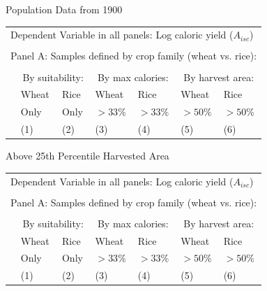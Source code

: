\documentclass[10pt, xcolor=dvipsnames]{beamer}
\begin{document}
\begin{frame}{Population Data from 1900}\label{reg1900}

{\footnotesize
\begin{tabularx}{\textwidth}{lXXXXXX}
\midrule
\multicolumn{7}{l}{Dependent Variable in all panels: Log caloric yield ($A_{isc}$)} \\ \\
\multicolumn{7}{l}{Panel A: Samples defined by crop family (wheat vs. rice):} \\ \\
 & \multicolumn{2}{c}{By suitability:} & \multicolumn{2}{c}{By max calories:} & \multicolumn{2}{c}{By harvest area:}\\ \cmidrule(lr){2-3} \cmidrule(lr){4-5} \cmidrule(lr){6-7} 
 & Wheat & Rice & Wheat  & Rice  & Wheat  & Rice \\
 & Only & Only &  $>33\%$ & $>33\%$ & $>50\%$ & $>50\%$   \\
 & (1) & (2) & (3) & (4) & (5) & (6) \\
\midrule

\midrule
\end{tabularx}
}

\hfill \hyperlink{robustness}{}
\end{frame}

\begin{frame}{Above 25th Percentile Harvested Area}\label{harvarea}

{\footnotesize
\begin{tabularx}{\textwidth}{lXXXXXX}
\midrule
\multicolumn{7}{l}{Dependent Variable in all panels: Log caloric yield ($A_{isc}$)} \\ \\
\multicolumn{7}{l}{Panel A: Samples defined by crop family (wheat vs. rice):} \\ \\
 & \multicolumn{2}{c}{By suitability:} & \multicolumn{2}{c}{By max calories:} & \multicolumn{2}{c}{By harvest area:}\\ \cmidrule(lr){2-3} \cmidrule(lr){4-5} \cmidrule(lr){6-7} 
 & Wheat & Rice & Wheat  & Rice  & Wheat  & Rice \\
 & Only & Only &  $>33\%$ & $>33\%$ & $>50\%$ & $>50\%$   \\
 & (1) & (2) & (3) & (4) & (5) & (6) \\
\midrule

\midrule
\end{tabularx}
}

\hfill \hyperlink{robustness}{}
\end{frame}
\end{document}
